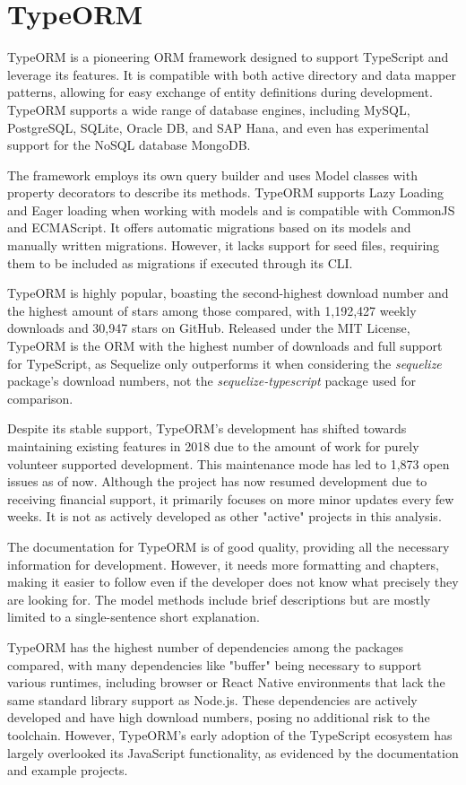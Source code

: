 \section{TypeORM}

TypeORM is a pioneering ORM framework designed to support TypeScript and
leverage its features. It is compatible with both active directory and data
mapper patterns, allowing for easy exchange of entity definitions during
development. TypeORM supports a wide range of database engines, including MySQL,
PostgreSQL, SQLite, Oracle DB, and SAP Hana, and even has experimental support
for the NoSQL database MongoDB.

The framework employs its own query builder and uses Model classes with property
decorators to describe its methods. TypeORM supports Lazy Loading and Eager
loading when working with models and is compatible with CommonJS and ECMAScript.
It offers automatic migrations based on its models and manually written
migrations. However, it lacks support for seed files, requiring them to be
included as migrations if executed through its CLI.

TypeORM is highly popular, boasting the second-highest download number and the
highest amount of stars among those compared, with 1,192,427 weekly downloads
and 30,947 stars on GitHub. Released under the MIT License, TypeORM is the ORM
with the highest number of downloads and full support for TypeScript, as
Sequelize only outperforms it when considering the \textit{sequelize} package's
download numbers, not the \textit{sequelize-typescript} package used for comparison.

Despite its stable support, TypeORM's development has shifted towards
maintaining existing features in 2018 due to the amount of work for purely
volunteer supported development. This maintenance mode has led to 1,873 open
issues as of now. Although the project has now resumed development due to receiving
financial support, it primarily focuses on more minor updates every few weeks.
It is not as actively developed as other "active" projects in this analysis.

The documentation for TypeORM is of good quality, providing all the necessary
information for development. However, it needs more formatting and chapters,
making it easier to follow even if the developer does not know what precisely
they are looking for. The model methods include brief descriptions but are
mostly limited to a single-sentence short explanation.

TypeORM has the highest number of dependencies among the packages compared, with
many dependencies like "buffer" being necessary to support various runtimes,
including browser or React Native environments that lack the same standard
library support as Node.js. These dependencies are actively developed and have
high download numbers, posing no additional risk to the toolchain. However,
TypeORM's early adoption of the TypeScript ecosystem has largely overlooked its
JavaScript functionality, as evidenced by the documentation and example
projects.

